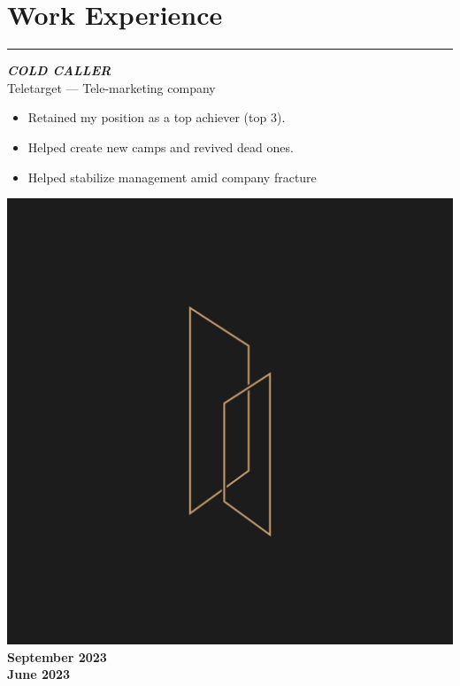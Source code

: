\documentclass[10pt]{article}
\newcommand{\fancy}[1]{\Large\textbf{\textit{#1}}}
\begin{document}

\section*{Work Experience}
\hrule
\vspace{3em}


\begin{minipage}{0.7\textwidth}
 \fancy{COLD CALLER} \\
{\large Teletarget --- Tele-marketing company} \\
\begin{itemize}
    \item Retained my position as a top achiever (top 3).
    \item Helped create new camps and revived dead ones.
    \item Helped stabilize management amid company fracture
\end{itemize}   
\end{minipage}
\hspace{-2pt}
\begin{minipage}{0.2\textwidth}
\begin{center}
\includegraphics[width=\textwidth]{tt_coldcalling.jpg} \\
    \large\textbf{September 2023\\June 2023} %
\end{center}
\end{minipage} %
\end{document}
